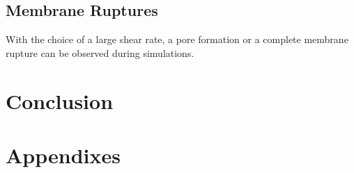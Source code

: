 \documentclass[%
 reprint,
 amsmath,amssymb,
 aps,
]{revtex4-2}
\begin{document}
\subsection{Membrane Ruptures}

With the choice of a large shear rate, a pore formation or a complete membrane rupture can be observed during simulations. 



\section{\label{conclusion}Conclusion}


\begin{acknowledgments}
\end{acknowledgments}

\appendix

\section{Appendixes}




\end{document}
